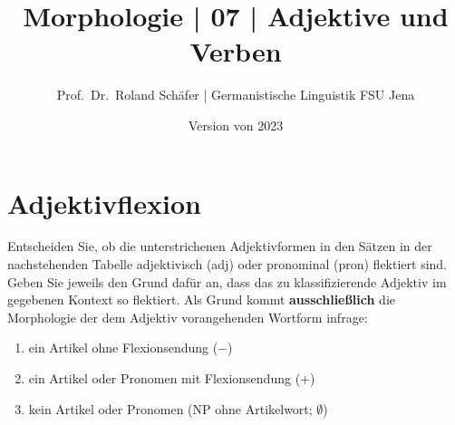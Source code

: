 \documentclass[12pt,a4paper,twoside]{article}
\author{Prof.\ Dr.\ Roland Schäfer | Germanistische Linguistik FSU Jena}
\title{Morphologie | 07 | Adjektive und Verben}
\date{Version von 2023}
\newcommand{\Zeile}{\vspace{\baselineskip}}
\newcommand{\Lf}{
  \setlength{\itemsep}{1pt}
  \setlength{\parskip}{0pt}
  \setlength{\parsep}{0pt}
}
\begin{document}
\maketitle

\Zeile

\section{Adjektivflexion}

Entscheiden Sie, ob die unterstrichenen Adjektivformen in den Sätzen in der nachstehenden Tabelle adjektivisch (adj) oder pronominal (pron) flektiert sind.
Geben Sie jeweils den Grund dafür an, dass das zu klassifizierende Adjektiv im gegebenen Kontext so flektiert.
Als Grund kommt \textbf{ausschließlich} die Morphologie der dem Adjektiv vorangehenden Wortform infrage:

\begin{enumerate}\Lf
  \item ein Artikel ohne Flexionsendung ($-$)
  \item ein Artikel oder Pronomen mit Flexionsendung ($+$)
  \item kein Artikel oder Pronomen (NP ohne Artikelwort; $\emptyset$)
\end{enumerate}
\end{document}
